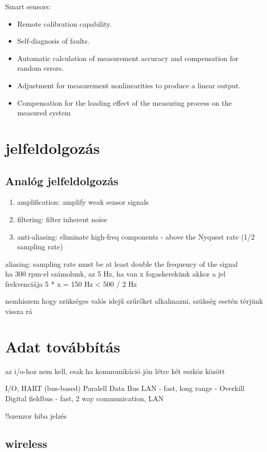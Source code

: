 \documentclass{article}
\begin{document}
	
	
	Smart sensors:
	\begin{itemize}
		\item Remote calibration capability.
		\item Self-diagnosis of faults.
		\item Automatic calculation of measurement accuracy and compensation for random errors.
		\item Adjustment for measurement nonlinearities to produce a linear output.
		\item Compensation for the loading effect of the measuring process on the measured system
	\end{itemize}
	
	
	\section{jelfeldolgozás}
	
	\subsection{Analóg jelfeldolgozás}
	\begin{enumerate}
		\item amplification: amplify weak sensor signals
		\item filtering: filter inherent noise
		\item anti-aliasing: eliminate high-freq components - above the Nyquest rate (1/2 sampling rate)
	\end{enumerate}
	aliasing: sampling rate must be at least double the frequency of the signal\\
	ha 300 rpm-el számolunk, az 5 Hz, ha van x fogaskerekünk akkor a jel frekvenciája 5 * x = 150 Hz < 500 / 2 Hz

	nemhiszem hogy szükséges valós idejű szűrőket alkalmazni, szükség esetén térjünk vissza rá
	
	\section{Adat továbbítás}
	
	az i/o-hoz nem kell, csak ha kommunikáció jön létre két eszköz között
	
	I/O, HART (bus-based)
	Paralell Data Bus
	LAN - fast, long range - Overkill
	Digital fieldbus - fast, 2 way communication, LAN
	
	!!szenzor hiba jelzés
	
	\subsection{wireless}
	
\end{document}
